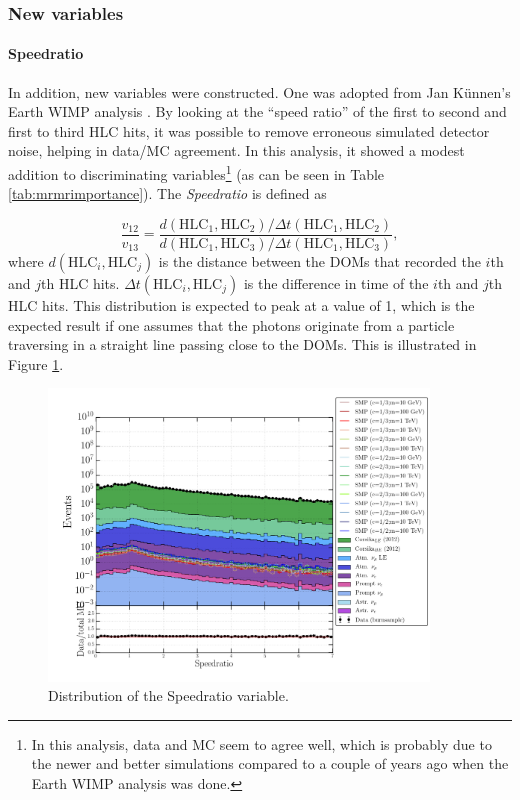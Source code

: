 \subsubsection{New variables}

\paragraph{Speedratio}
In addition, new variables were constructed. One was adopted from Jan K\"unnen's Earth WIMP analysis \cite{kunnenthesis}. By looking at the ``speed ratio'' of the first to second and first to third HLC hits, it was possible to remove erroneous simulated detector noise, helping in data/MC agreement. In this analysis, it showed a modest addition to discriminating variables\footnote{In this analysis, data and MC seem to agree well, which is probably due to the newer and better simulations compared to a couple of years ago when the Earth WIMP analysis was done.} (as can be seen in Table \ref{tab:mrmrimportance}).  The \textit{Speedratio} is defined as

\begin{equation}
\frac{v_{12}}{v_{13}} = \frac{d\left( \textrm{HLC}_1,\textrm{HLC}_2 \right)/\Delta t\left(\textrm{HLC}_1, \textrm{HLC}_2\right)}{d\left(\textrm{HLC}_1, \textrm{HLC}_3 \right)/\Delta t\left(\textrm{HLC}_1,\textrm{HLC}_3 \right)},
\end{equation}
where $d\left( \textrm{HLC}_i,\textrm{HLC}_j \right)$ is the distance between the DOMs that recorded the $i$th and $j$th HLC hits. $\Delta t\left(\textrm{HLC}_i, \textrm{HLC}_j\right)$ is the difference in time of the $i$th and $j$th HLC hits. This distribution is expected to peak at a value of 1, which is the expected result if one assumes that the photons originate from a particle traversing in a straight line passing close to the DOMs. This is illustrated in Figure \ref{fig:newvariables1}.

\begin{figure}
\centering
\includegraphics[width=0.9\textwidth]{chapter8/img/1D_stack_speedratio.png}
\caption{Distribution of the Speedratio variable.}
\label{fig:newvariables1}
\end{figure}


